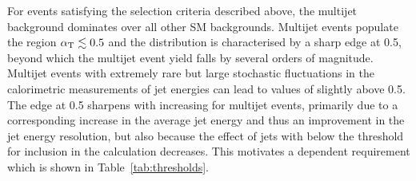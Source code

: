 For events satisfying the selection criteria described above, the
multijet background dominates over all other SM backgrounds. Multijet
events populate the region $\alpha_{\text T} \lesssim 0.5$ and the \alphat
distribution is characterised by a sharp edge at 0.5, beyond which the
multijet event yield falls by several orders of magnitude.%
Multijet events with extremely rare but large stochastic fluctuations in the
calorimetric measurements of jet energies can lead to values of
\alphat slightly above 0.5. The edge at 0.5 sharpens with increasing
\scalht for multijet events, primarily due to a corresponding increase
in the average jet energy and thus an improvement in the jet energy
resolution, but also because the effect of jets with \et below the threshold for inclusion in the \alphat calculation decreases. This motivates a \scalht dependent \alphat requirement which is shown in Table~\ref{tab:thresholds}.


